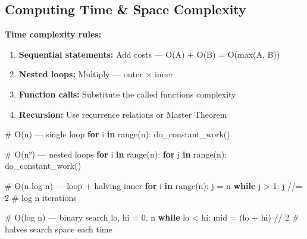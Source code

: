 \documentclass[11pt]{article}
\providecommand{\tightlist}{\setlength{\itemsep}{1pt}\setlength{\parskip}{0pt}}
\newenvironment{Shaded}{\begin{snugshade}}{\end{snugshade}}
\newcommand{\BuiltInTok}[1]{\textcolor[rgb]{0.50,0.55,0.55}{#1}}
\newcommand{\CommentTok}[1]{\textcolor[rgb]{0.48,0.49,0.49}{#1}}
\newcommand{\ControlFlowTok}[1]{\textcolor[rgb]{0.99,0.74,0.29}{\textbf{#1}}}
\newcommand{\DecValTok}[1]{\textcolor[rgb]{0.96,0.45,0.00}{#1}}
\newcommand{\KeywordTok}[1]{\textcolor[rgb]{0.81,0.81,0.76}{\textbf{#1}}}
\newcommand{\NormalTok}[1]{\textcolor[rgb]{0.81,0.81,0.76}{#1}}
\newcommand{\OperatorTok}[1]{\textcolor[rgb]{0.81,0.81,0.76}{#1}}
\begin{document}
\subsection{Computing Time \& Space Complexity}\label{computing-time--space-complexity}

\textbf{Time complexity rules:}

\begin{enumerate}
\def\labelenumi{\arabic{enumi}.}
\tightlist
\item
  \textbf{Sequential statements:} Add costs --- O(A) + O(B) = O(max(A, B))
\item
  \textbf{Nested loops:} Multiply --- outer \(\times\) inner
\item
  \textbf{Function calls:} Substitute the called function\textquotesingle s complexity
\item
  \textbf{Recursion:} Use recurrence relations or Master Theorem
\end{enumerate}


\begin{Shaded}
\begin{Highlighting}[]
\CommentTok{\# O(n) — single loop}
\ControlFlowTok{for}\NormalTok{ i }\KeywordTok{in} \BuiltInTok{range}\NormalTok{(n):}
\NormalTok{    do\_constant\_work()}

\CommentTok{\# O(n²) — nested loops}
\ControlFlowTok{for}\NormalTok{ i }\KeywordTok{in} \BuiltInTok{range}\NormalTok{(n):}
    \ControlFlowTok{for}\NormalTok{ j }\KeywordTok{in} \BuiltInTok{range}\NormalTok{(n):}
\NormalTok{        do\_constant\_work()}

\CommentTok{\# O(n log n) — loop + halving inner}
\ControlFlowTok{for}\NormalTok{ i }\KeywordTok{in} \BuiltInTok{range}\NormalTok{(n):}
\NormalTok{    j }\OperatorTok{=}\NormalTok{ n}
    \ControlFlowTok{while}\NormalTok{ j }\OperatorTok{\textgreater{}} \DecValTok{1}\NormalTok{:}
\NormalTok{        j }\OperatorTok{//=} \DecValTok{2}   \CommentTok{\# log n iterations}

\CommentTok{\# O(log n) — binary search}
\NormalTok{lo, hi }\OperatorTok{=} \DecValTok{0}\NormalTok{, n}
\ControlFlowTok{while}\NormalTok{ lo }\OperatorTok{\textless{}}\NormalTok{ hi:}
\NormalTok{    mid }\OperatorTok{=}\NormalTok{ (lo }\OperatorTok{+}\NormalTok{ hi) }\OperatorTok{//} \DecValTok{2}
    \CommentTok{\# halves search space each time}
\end{Highlighting}
\end{Shaded}
\end{document}
